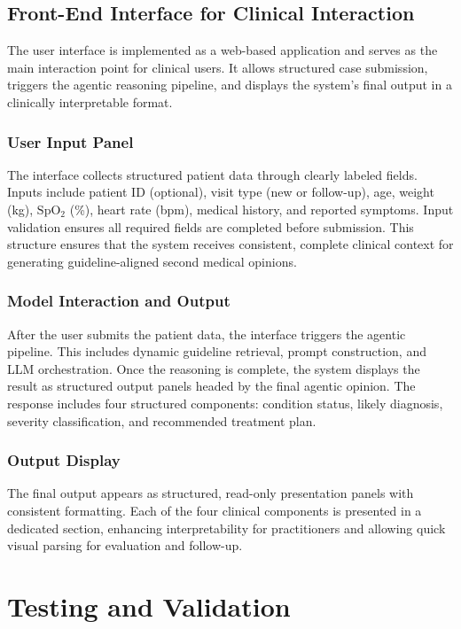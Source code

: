 \documentclass[preprint,12pt]{elsarticle}
\begin{document}
\subsection{Front-End Interface for Clinical Interaction}

The user interface is implemented as a web-based application and serves as the main interaction point for clinical users. It allows structured case submission, triggers the agentic reasoning pipeline, and displays the system's final output in a clinically interpretable format.

\subsubsection{User Input Panel}
The interface collects structured patient data through clearly labeled fields. Inputs include patient ID (optional), visit type (new or follow-up), age, weight (kg), $\mathrm{SpO_2}$ (\%), heart rate (bpm), medical history, and reported symptoms. Input validation ensures all required fields are completed before submission. This structure ensures that the system receives consistent, complete clinical context for generating guideline-aligned second medical opinions.

\subsubsection{Model Interaction and Output}
After the user submits the patient data, the interface triggers the agentic pipeline. This includes dynamic guideline retrieval, prompt construction, and LLM orchestration. Once the reasoning is complete, the system displays the result as structured output panels headed by the final agentic opinion. The response includes four structured components: condition status, likely diagnosis, severity classification, and recommended treatment plan.

\subsubsection{Output Display}
\label{output-display}
The final output appears as structured, read-only presentation panels with consistent formatting. Each of the four clinical components is presented in a dedicated section, enhancing interpretability for practitioners and allowing quick visual parsing for evaluation and follow-up.

\section{Testing and Validation}
\label{sec:test}
\end{document}
